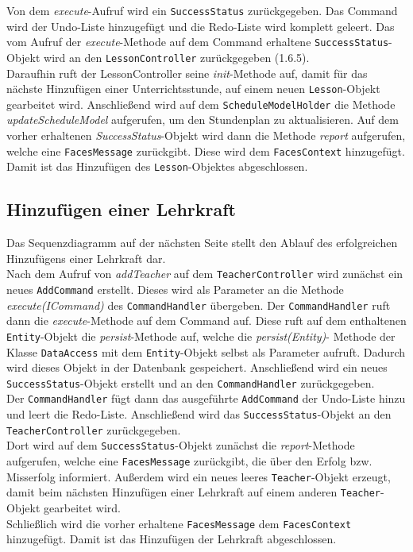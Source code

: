 \documentclass[fontsize=12pt,paper=a4,twoside]{scrartcl}
\begin{document}
Von dem \textit{execute}-Aufruf wird ein \texttt{SuccessStatus} zurückgegeben. Das Command wird der Undo-Liste hinzugefügt und die Redo-Liste wird komplett geleert. Das vom Aufruf der \textit{execute}-Methode auf dem Command erhaltene \texttt{SuccessStatus}-Objekt wird an den \texttt{LessonController} zurückgegeben (1.6.5). \\
Daraufhin ruft der LessonController seine \textit{init}-Methode auf, damit für das nächste Hinzufügen einer Unterrichtsstunde, auf einem neuen \texttt{Lesson}-Objekt gearbeitet wird.
Anschließend wird auf dem \texttt{ScheduleModelHolder} die Methode \textit{updateScheduleModel} aufgerufen, um den Stundenplan zu aktualisieren. Auf dem vorher erhaltenen \textit{SuccessStatus}-Objekt wird dann die Methode \textit{report} aufgerufen, welche eine \texttt{FacesMessage} zurückgibt. Diese wird dem \texttt{FacesContext} hinzugefügt. \\
Damit ist das Hinzufügen des \texttt{Lesson}-Objektes abgeschlossen.









\subsection{Hinzufügen einer Lehrkraft}
Das Sequenzdiagramm auf der nächsten Seite stellt den Ablauf des erfolgreichen Hinzufügens einer Lehrkraft dar.\\
Nach dem Aufruf von \textit{addTeacher} auf dem \texttt{TeacherController} wird zunächst ein neues \texttt{AddCommand} erstellt. Dieses wird als Parameter an die Methode \textit{execute(ICommand)} des \texttt{CommandHandler} übergeben. Der \texttt{CommandHandler} ruft dann die \textit{execute}-Methode auf dem Command auf. Diese ruft auf dem  enthaltenen \texttt{Entity}-Objekt die \textit{persist}-Methode auf, welche die \textit{persist(Entity)}- Methode der Klasse \texttt{DataAccess} mit dem \texttt{Entity}-Objekt selbst als Parameter aufruft. Dadurch wird dieses Objekt in der Datenbank gespeichert. Anschließend wird ein neues \texttt{SuccessStatus}-Objekt erstellt und an den \texttt{CommandHandler} zurückgegeben.\\
Der \texttt{CommandHandler} fügt dann das ausgeführte \texttt{AddCommand} der Undo-Liste hinzu und leert die Redo-Liste. Anschließend wird das \texttt{SuccessStatus}-Objekt an den \texttt{TeacherController} zurückgegeben.\\
Dort wird auf dem \texttt{SuccessStatus}-Objekt zunächst die \textit{report}-Methode aufgerufen, welche eine \texttt{FacesMessage} zurückgibt, die über den Erfolg bzw. Misserfolg informiert. Außerdem wird ein neues leeres \texttt{Teacher}-Objekt erzeugt, damit beim nächsten Hinzufügen einer Lehrkraft auf einem anderen \texttt{Teacher}-Objekt gearbeitet wird.\\
Schließlich wird die vorher erhaltene \texttt{FacesMessage} dem \texttt{FacesContext} hinzugefügt. Damit ist das Hinzufügen der Lehrkraft abgeschlossen.
\end{document}
